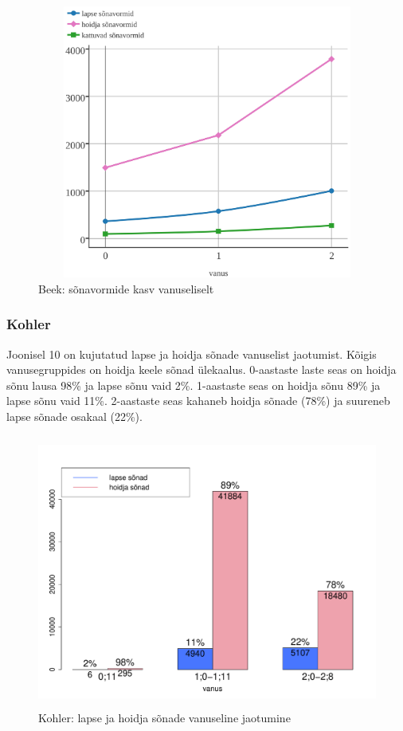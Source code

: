 \documentclass[12pt]{article}
\begin{document}


\begin{figure}[H]
    \centering
    \includegraphics[width=12cm, height=9cm]{beek_kum_crop}
    \caption{Beek: sõnavormide kasv vanuseliselt}
\end{figure}




\subsubsection{Kohler}

Joonisel 10 on kujutatud lapse ja hoidja sõnade vanuselist jaotumist. Kõigis vanusegruppides on hoidja keele sõnad ülekaalus. 0-aastaste laste seas on hoidja sõnu lausa 98\% ja lapse sõnu vaid 2\%. 1-aastaste seas on hoidja sõnu 89\% ja lapse sõnu vaid 11\%. 2-aastaste seas kahaneb hoidja sõnade (78\%) ja suureneb lapse sõnade osakaal (22\%).

\begin{figure}[H]
    \centering
    \includegraphics[width=12cm, height=9cm]{kohler_vanus_sonad}
    \caption{Kohler: lapse ja hoidja sõnade vanuseline jaotumine}
\end{figure}
\end{document}
